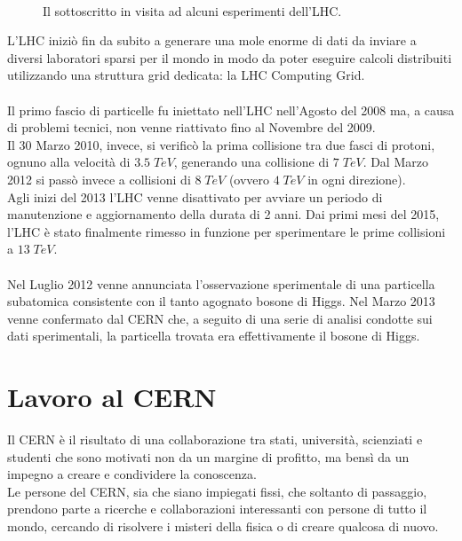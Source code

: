 			\begin{figure}[h!]
				\begin{center}
					~
				\end{center}
				\caption[Visita all'LHC]{Il sottoscritto in visita ad alcuni esperimenti dell'LHC.}
				\label{fig:visita_lhc}
			\end{figure}
			\noindent
			L'\ac{LHC} iniziò fin da subito a generare una mole enorme di dati da inviare a diversi laboratori sparsi per il mondo in modo da poter eseguire calcoli distribuiti utilizzando una struttura grid dedicata: la LHC Computing Grid.\\
			\\
			Il primo fascio di particelle fu iniettato nell'\ac{LHC} nell'Agosto del 2008 ma, a causa di problemi tecnici, non venne riattivato fino al Novembre del 2009.\\
			Il 30 Marzo 2010, invece, si verificò la prima collisione tra due fasci di protoni, ognuno alla velocità di $3.5 \; TeV$, generando una collisione di $7 \; TeV$. Dal Marzo 2012 si passò invece a collisioni di $8 \; TeV$ (ovvero $4 \; TeV$ in ogni direzione).\\
			Agli inizi del 2013 l'\ac{LHC} venne disattivato per avviare un periodo di manutenzione e aggiornamento della durata di 2 anni. Dai primi mesi del 2015, l'\ac{LHC} è stato finalmente rimesso in funzione per sperimentare le prime collisioni a $13 \; TeV$.\\
			\\
			Nel Luglio 2012 venne annunciata l'osservazione sperimentale di una particella subatomica consistente con il tanto agognato bosone di Higgs. Nel Marzo 2013 venne confermato dal \ac{CERN} che, a seguito di una serie di analisi condotte sui dati sperimentali, la particella trovata era effettivamente il bosone di Higgs.
	
	\section{Lavoro al CERN} \label{sec:CERN;lavoro}
	
		Il \ac{CERN} è il risultato di una collaborazione tra stati, università, scienziati e studenti che sono motivati non da un margine di profitto, ma bensì da un impegno a creare e condividere la conoscenza.\\
		Le persone del \ac{CERN}, sia che siano impiegati fissi, che soltanto di passaggio, prendono parte a ricerche e collaborazioni interessanti con persone di tutto il mondo, cercando di risolvere i misteri della fisica o di creare qualcosa di nuovo.
		
